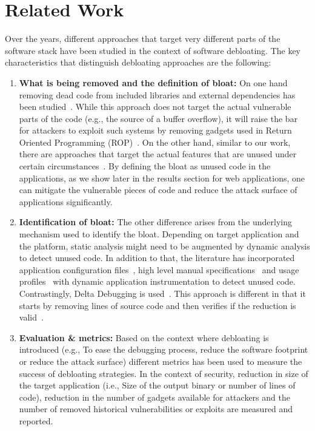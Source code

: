 
\chapter{Related Work\label{ch:pastwork}}

Over the years, different approaches that target very different parts of the
software stack have been studied in the context of software debloating. The key characteristics that distinguish debloating approaches are the following:

\begin{enumerate}
  \item{\textbf{What is being removed and the definition of bloat:} On one hand removing dead code from included libraries and external dependencies has been studied~\cite{jiang2016Jred, jiang2018reddroid, quach2018debloating}. While this approach does not
  target the actual vulnerable parts of the code (e.g., the source of a buffer overflow), it will raise the bar for attackers to exploit such systems by removing gadgets used in Return Oriented Programming (ROP)~\cite{shacham2007geometry}.
  On the other hand, similar to our work, there are approaches that target the actual features that are unused under certain circumstances~\cite{boomsma2012Dead, heo2018effective, regehr2012CReduce, Snyder2017, sun2018perses}. By defining the bloat as unused code in the applications, as we show later in the results section for web applications, one can mitigate the vulnerable pieces of code and reduce the attack surface of applications significantly.}
  \item{\textbf{Identification of bloat:} The other difference arises from the underlying mechanism used to identify the bloat. Depending on target application and the platform, static analysis might need to be augmented by dynamic analysis to detect
  unused code. In addition to that, the literature has incorporated application configuration files~\cite{Koo:2019:CSD:3301417.3312501}, high level manual specifications~\cite{heo2018effective, sharif2018Trimmer} and usage profiles~\cite{boomsma2012Dead} with dynamic application instrumentation to detect unused code. Contrastingly, Delta Debugging is used~\cite{zeller2002Delta}. This approach is different in that it starts by removing lines of source code and then verifies if the reduction is valid~\cite{heo2018effective, regehr2012CReduce, sun2018perses}.}
  \item{\textbf{Evaluation \& metrics:} Based on the context where debloating is introduced (e.g., To ease the debugging process, reduce the software footprint or reduce the attack surface) different metrics has been used to measure the success of debloating strategies. In the context of security, reduction in size of the target application (i.e., Size of the output binary or number of lines of code), reduction in the number of gadgets available for attackers and the number of removed historical vulnerabilities or exploits are measured and reported.}
\end{enumerate}


